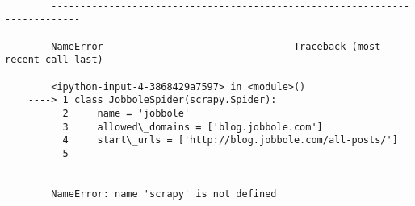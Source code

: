 \documentclass[11pt]{article}
\begin{document}
    \begin{Verbatim}[commandchars=\\\{\}]

        ---------------------------------------------------------------------------

        NameError                                 Traceback (most recent call last)

        <ipython-input-4-3868429a7597> in <module>()
    ----> 1 class JobboleSpider(scrapy.Spider):
          2     name = 'jobbole'
          3     allowed\_domains = ['blog.jobbole.com']
          4     start\_urls = ['http://blog.jobbole.com/all-posts/']
          5 
    

        NameError: name 'scrapy' is not defined

    \end{Verbatim}


    
    
    
    
\end{document}
